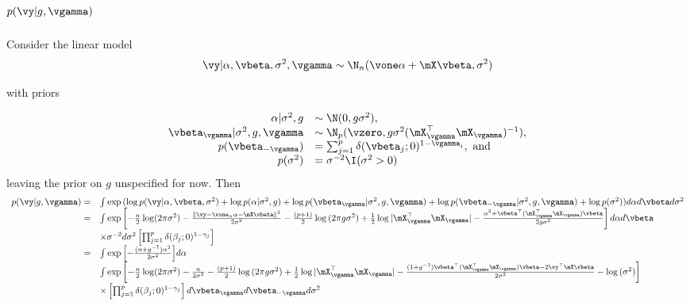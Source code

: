 \section{$p(\vy | g, \vgamma)$}
\noindent Consider the linear model
\[
	\vy | \alpha, \vbeta, \sigma^2, \vgamma \sim \N_n(\vone \alpha + \mX \vbeta, \sigma^2)
\]

\noindent with priors

$$
\begin{array}{rl}
	\alpha | \sigma^2, g &\sim \N(0, g \sigma^2), \\
	\vbeta_\vgamma | \sigma^2, g, \vgamma &\sim \N_p(\vzero, g \sigma^2 (\mX_\vgamma^\top \mX_\vgamma)^{-1}), \\
	p(\vbeta_{-\vgamma}) &= \sum_{j=1}^p \delta(\vbeta_j; 0)^{1 - \vgamma_i}, \text{ and } \\
	p(\sigma^2) &= \sigma^{-2} \I(\sigma^2 > 0)
\end{array}
$$
leaving the prior on $g$ unspecified for now. Then
$$
\begin{array}{rl}
	p(\vy | g, \vgamma) =&
	\int \exp{(\log p(\vy | \alpha, \vbeta, \sigma^2)
	+ \log p(\alpha | \sigma^2, g)
	+ \log p(\vbeta_\vgamma | \sigma^2, g, \vgamma)
	+ \log p(\vbeta_{-\vgamma} | \sigma^2, g, \vgamma)
	+ \log p(\sigma^2))} d \alpha d \vbeta d \sigma^2 \\
	=& \int \exp{\left[
	-\frac{n}{2} \log (2 \pi \sigma^2)
	- \frac{\|\vy - \vone_n \alpha - \mX \vbeta\|^2}{2 \sigma^2} 
	-\frac{(p + 1)}{2} \log{(2\pi g \sigma^2)}
	+ \frac{1}{2} \log{|\mX_\vgamma^\top \mX_\vgamma|}
	- \frac{\alpha^2 + \vbeta^\top (\mX_\vgamma^\top \mX_\vgamma) \vbeta}{2 g \sigma^{2}} \right] d \alpha d \vbeta } \\
	&\times \sigma^{-2} d \sigma^2
	\left[ \prod_{j=1}^p \delta(\beta_j; 0)^{1 - \gamma_j} \right] \\
	=& \int \exp{\left[
	-\frac{(n + g^{-1})\alpha^2}{2 \sigma^2} \right]} d \alpha \\
	&  \int \exp{\left[
	-\frac{n}{2} \log (2 \pi \sigma^2)
	-\frac{n}{2 \sigma^2} 
	-\frac{(p + 1)}{2} \log{(2\pi g \sigma^2)}
	+ \frac{1}{2} \log{|\mX_\vgamma^\top \mX_\vgamma|}
	- \frac{(1 + g^{-1})\vbeta^\top (\mX_\vgamma^\top \mX_\vgamma) \vbeta - 2 \vy^\top \mX \vbeta}{2 \sigma^{2}}
	-\log{(\sigma^2)}
	\right]}  \\
	&\times \left[ \prod_{j=1}^p \delta(\beta_j; 0)^{1 - \gamma_j} \right] d \vbeta_\vgamma d \vbeta_{-\vgamma} d \sigma^2
\end{array}
$$

